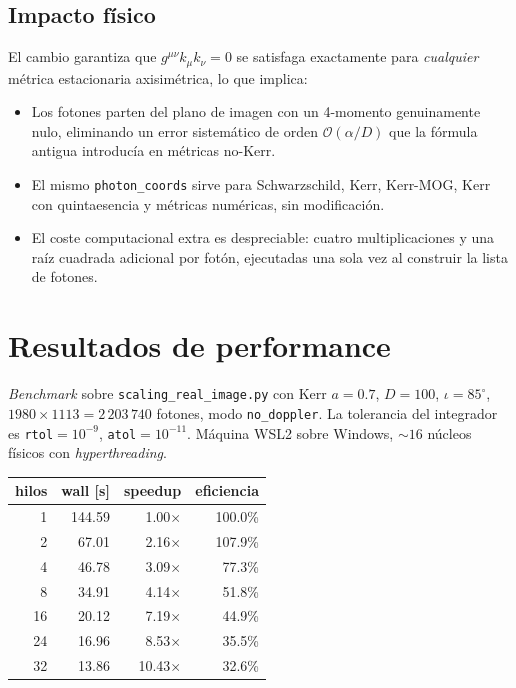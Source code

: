 \documentclass[11pt,a4paper]{article}
\begin{document}
\subsection{Impacto físico}

El cambio garantiza que $g^{\mu\nu}k_\mu k_\nu = 0$ se satisfaga
exactamente para \emph{cualquier} métrica estacionaria axisimétrica,
lo que implica:
\begin{itemize}
  \item Los fotones parten del plano de imagen con un 4-momento
        genuinamente nulo, eliminando un error sistemático de orden
        $\mathcal{O}(\alpha/D)$ que la fórmula antigua introducía en
        métricas no-Kerr.
  \item El mismo \texttt{photon\_coords} sirve para Schwarzschild,
        Kerr, Kerr-MOG, Kerr con quintaesencia y métricas numéricas,
        sin modificación.
  \item El coste computacional extra es despreciable: cuatro
        multiplicaciones y una raíz cuadrada adicional por fotón,
        ejecutadas una sola vez al construir la lista de fotones.
\end{itemize}

\section{Resultados de performance}

\emph{Benchmark} sobre \texttt{scaling\_real\_image.py} con
Kerr $a = 0.7$, $D = 100$, $\iota = 85^{\circ}$, $1980 \times 1113 =
2\,203\,740$ fotones, modo \verb|no_doppler|. La tolerancia del
integrador es \texttt{rtol}$=10^{-9}$, \texttt{atol}$=10^{-11}$. Máquina
WSL2 sobre Windows, $\sim 16$ núcleos físicos con \emph{hyperthreading}.

\begin{center}
\begin{tabular}{@{}rrrr@{}}
\toprule
\textbf{hilos} & \textbf{wall {[s]}} & \textbf{speedup} & \textbf{eficiencia} \\
\midrule
 1 & 144.59 &  1.00$\times$ & 100.0\% \\
 2 &  67.01 &  2.16$\times$ & 107.9\% \\
 4 &  46.78 &  3.09$\times$ &  77.3\% \\
 8 &  34.91 &  4.14$\times$ &  51.8\% \\
16 &  20.12 &  7.19$\times$ &  44.9\% \\
24 &  16.96 &  8.53$\times$ &  35.5\% \\
32 &  13.86 & 10.43$\times$ &  32.6\% \\
\bottomrule
\end{tabular}
\end{center}
\end{document}
